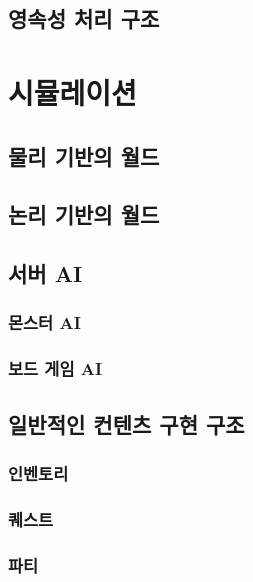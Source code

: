 \documentclass[chapter,kosection, 10.5pt, romanfixed, a4paper]{oblivoir}
\begin{document}
\subsection{영속성 처리 구조}




\section{시뮬레이션}


\subsection{물리 기반의 월드}


\subsection{논리 기반의 월드}

\subsection{서버 AI}

\subsubsection{몬스터 AI}

\subsubsection{보드 게임 AI}


\subsection{일반적인 컨텐츠 구현 구조}

\subsubsection{인벤토리}


\subsubsection{퀘스트}

\subsubsection{파티}
\end{document}
